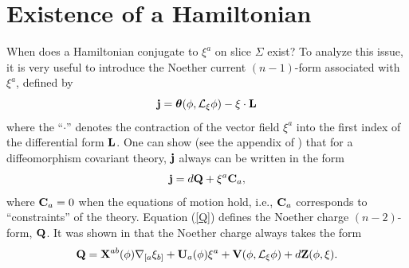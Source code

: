 \section{Existence of a Hamiltonian}

When does a Hamiltonian conjugate to $\xi^a$ on slice $\Sigma$ exist?
To analyze this issue, it is very useful to introduce the Noether
current $(n-1)$-form associated with $\xi^a$, defined by
\begin{equation}
{\bf j} = {\mbox{\boldmath $\theta$}} (\phi, {\cal L}_\xi \phi) -
\xi \cdot {\bf L}
\label{j}
\end{equation}
where the ``$\cdot$'' denotes the contraction of the vector field
$\xi^a$ into the first index of the differential form ${\bf L}$. One
can show (see the appendix of \cite{iw2}) that for a diffeomorphism
covariant theory, ${\bf j}$ always can be written in the form
\begin{equation}
{\bf j} = d {\bf Q} + \xi^a {\bf {C}}_a ,
\label{Q}
\end{equation}
where ${\bf {C}}_a = 0$ when the equations of motion hold, i.e., ${\bf
{C}}_a$ corresponds to ``constraints'' of the theory. Equation
(\ref{Q}) defines the Noether charge $(n-2)$-form, $\bf Q$. It was
shown in \cite{iw} that the Noether charge always takes the form
\begin{equation}
{\bf Q} = {\bf X}^{ab}(\phi) \nabla_{[a} \xi_{b]} + {\bf U}_a (\phi)
\xi^a + {\bf V} (\phi, {\cal L}_\xi \phi) + d {\bf Z}(\phi, \xi) .
\label{Qform}
\end{equation}

